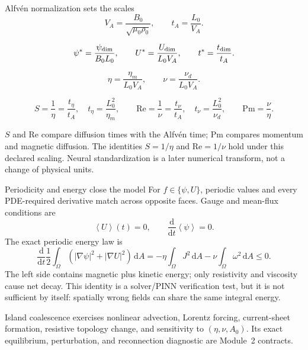 \documentclass[aspectratio=169,11pt]{beamer}
\newcommand{\dd}{\,\mathrm{d}}
\newcommand{\average}[1]{\left\langle #1\right\rangle}
\newcommand{\currentmodule}{Module 1}
\newcommand{\moduleprogress}{1 of 6}
\newcommand{\setmodule}[2]{%
  \renewcommand{\currentmodule}{#1}%
  \renewcommand{\moduleprogress}{#2}%
}
\begin{document}
\setmodule{Module 1}{5 of 6}
\begin{frame}{Alfv\'en normalization sets the scales}
\[
V_A=\frac{B_0}{\sqrt{\mu_0\rho_0}},
\qquad
t_A=\frac{L_0}{V_A}.
\]

\[
\psi^*=\frac{\psi_{\rm dim}}{B_0L_0},
\qquad
U^*=\frac{U_{\rm dim}}{L_0V_A},
\qquad
t^*=\frac{t_{\rm dim}}{t_A}.
\]

\[
\eta=\frac{\eta_m}{L_0V_A},
\qquad
\nu=\frac{\nu_d}{L_0V_A}.
\]

\[
S=\frac{1}{\eta}=\frac{t_\eta}{t_A},\quad t_\eta=\frac{L_0^2}{\eta_m},
\qquad
\mathrm{Re}=\frac{1}{\nu}=\frac{t_\nu}{t_A},\quad t_\nu=\frac{L_0^2}{\nu_d},
\qquad
\mathrm{Pm}=\frac{\nu}{\eta}.
\]

$S$ and $\mathrm{Re}$ compare diffusion times with the Alfv\'en time; $\mathrm{Pm}$ compares momentum and magnetic diffusion.  The identities $S=1/\eta$ and $\mathrm{Re}=1/\nu$ hold under this declared scaling.  Neural standardization is a later numerical transform, not a change of physical units.
\end{frame}

\setmodule{Module 1}{6 of 6}
\begin{frame}{Periodicity and energy close the model}
For $f\in\{\psi,U\}$, periodic values and every PDE-required derivative match across opposite faces. Gauge and mean-flux conditions are
\[
\boxed{\average{U}(t)=0,}
\qquad
\boxed{\frac{\mathrm d}{\mathrm dt}\average{\psi}=0.}
\]
The exact periodic energy law is
\[
\boxed{
\frac{\mathrm d}{\mathrm dt}\frac12\int_{\Omega}
\left(|\nabla\psi|^2+|\nabla U|^2\right)\dd A
=-\eta\int_{\Omega}J^2\dd A
-\nu\int_{\Omega}\omega^2\dd A\le 0.}
\]
The left side contains magnetic plus kinetic energy; only resistivity and viscosity cause net decay.  This identity is a solver/PINN verification test, but it is not sufficient by itself: spatially wrong fields can share the same integral energy.

Island coalescence exercises nonlinear advection, Lorentz forcing, current-sheet formation, resistive topology change, and sensitivity to $(\eta,\nu,A_0)$.  Its exact equilibrium, perturbation, and reconnection diagnostic are Module~2 contracts.
\end{frame}

\end{document}
